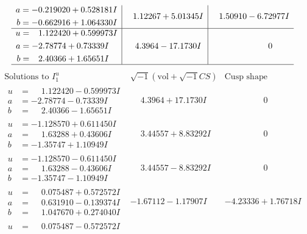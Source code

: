 \documentclass[1p]{elsarticle_modified}
\theoremstyle{definition}
\newcommand{\I}{\sqrt{-1}}
\begin{document}
$$\begin{array}{c|c|c}
\begin{aligned}
a &= -0.219020 + 0.528181 I \\
b &= -0.662916 + 1.064330 I\end{aligned}
 & \phantom{-}1.12267 + 5.01345 I & \phantom{-}1.50910 - 6.72977 I \\ \hline\begin{aligned}
u &= \phantom{-}1.122420 + 0.599973 I \\
a &= -2.78774 + 0.73339 I \\
b &= \phantom{-}2.40366 + 1.65651 I\end{aligned}
 & \phantom{-}4.3964 - 17.1730 I & \phantom{-0.000000 } 0\\
 \hline 
 \end{array}$$\newpage$$\begin{array}{c|c|c}  
\text{Solutions to }I^u_{1}& \I (\text{vol} + \sqrt{-1}CS) & \text{Cusp shape}\\
 \hline 
\begin{aligned}
u &= \phantom{-}1.122420 - 0.599973 I \\
a &= -2.78774 - 0.73339 I \\
b &= \phantom{-}2.40366 - 1.65651 I\end{aligned}
 & \phantom{-}4.3964 + 17.1730 I & \phantom{-0.000000 } 0 \\ \hline\begin{aligned}
u &= -1.128570 + 0.611450 I \\
a &= \phantom{-}1.63288 + 0.43606 I \\
b &= -1.35747 + 1.10949 I\end{aligned}
 & \phantom{-}3.44557 + 8.83292 I & \phantom{-0.000000 } 0 \\ \hline\begin{aligned}
u &= -1.128570 - 0.611450 I \\
a &= \phantom{-}1.63288 - 0.43606 I \\
b &= -1.35747 - 1.10949 I\end{aligned}
 & \phantom{-}3.44557 - 8.83292 I & \phantom{-0.000000 } 0 \\ \hline\begin{aligned}
u &= \phantom{-}0.075487 + 0.572572 I \\
a &= \phantom{-}0.631910 - 0.139374 I \\
b &= \phantom{-}1.047670 + 0.274040 I\end{aligned}
 & -1.67112 - 1.17907 I & -4.23336 + 1.76718 I \\ \hline\begin{aligned}
u &= \phantom{-}0.075487 - 0.572572 I \\

\end{aligned}
\end{array}$$
\end{document}
